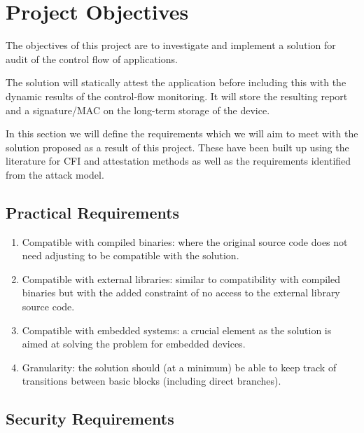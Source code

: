 \section{Project Objectives} \label{projectRequirements}

The objectives of this project are to investigate and implement a solution for audit of the control flow of applications.

The solution will statically attest the application before including this with the dynamic results of the control-flow monitoring. It will store the resulting report and a signature\slash MAC on the long-term storage of the device.

In this section we will define the requirements which we will aim to meet with the solution proposed as a result of this project. These have been built up using the literature for CFI and attestation methods as well as the requirements identified from the attack model.

\subsection{Practical Requirements}

\begin{enumerate}
	\item Compatible with compiled binaries: where the original source code does not need adjusting to be compatible with the solution.
	\item Compatible with external libraries: similar to compatibility with compiled binaries but with the added constraint of no access to the external library source code. 
	\item Compatible with embedded systems: a crucial element as the solution is aimed at solving the problem for embedded devices.
	\item Granularity: the solution should (at a minimum) be able to keep track of transitions between basic blocks (including direct branches).
\end{enumerate}

\subsection{Security Requirements}
 
